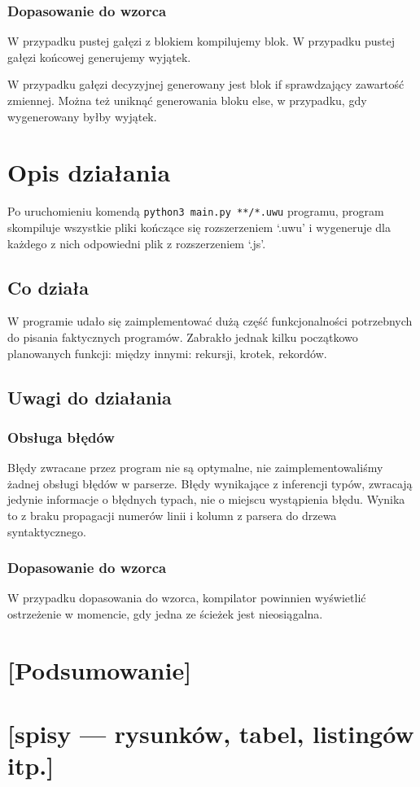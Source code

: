 \documentclass{article}
\begin{document}
\subsubsection{Dopasowanie do wzorca}
W przypadku pustej gałęzi z blokiem kompilujemy blok.
W przypadku pustej gałęzi końcowej generujemy wyjątek.


W przypadku gałęzi decyzyjnej generowany jest blok if sprawdzający zawartość zmiennej. Można też uniknąć generowania bloku else, w przypadku, gdy wygenerowany byłby wyjątek.\newpage


\section{Opis działania}
Po uruchomieniu komendą \lstinline{python3 main.py **/*.uwu} programu, program skompiluje wszystkie pliki kończące się rozszerzeniem `.uwu' i wygeneruje dla każdego z nich odpowiedni plik z rozszerzeniem `.js'.

\subsection{Co działa}
W programie udało się zaimplementować dużą część funkcjonalności potrzebnych do pisania faktycznych programów. Zabrakło jednak kilku początkowo planowanych funkcji: między innymi: rekursji, krotek, rekordów.
\subsection{Uwagi do działania}
\subsubsection{Obsługa błędów}
Błędy zwracane przez program nie są optymalne, nie zaimplementowaliśmy żadnej obsługi błędów w parserze. Błędy wynikające z inferencji typów, zwracają jedynie informacje o błędnych typach, nie o miejscu wystąpienia błędu. Wynika to z braku propagacji numerów linii i kolumn z parsera do drzewa syntaktycznego.
\subsubsection{Dopasowanie do wzorca}
W przypadku dopasowania do wzorca, kompilator powinnien wyświetlić ostrzeżenie w momencie, gdy jedna ze ścieżek jest nieosiągalna.
\section{[Podsumowanie]}
\section{[spisy --- rysunków, tabel, listingów itp.]}




\end{document}
